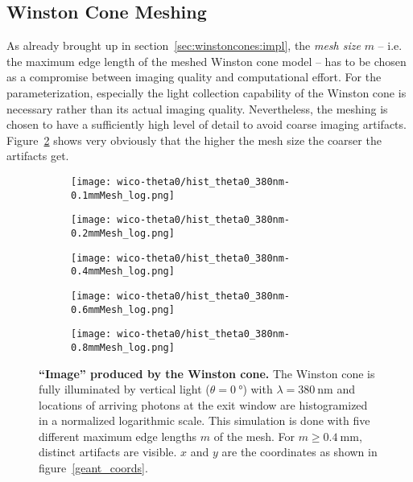 \subsection{Winston Cone Meshing}\label{sec:wico_meshing}

As already brought up in section~\ref{sec:winstoncones:impl}, the \textit{mesh size} $m$ -- i.e. the maximum edge length of the meshed Winston cone model -- has to be chosen as a compromise between imaging quality and computational effort. For the \iceact parameterization, especially the light collection capability of the Winston cone is necessary rather than its actual imaging quality. Nevertheless, the meshing is chosen to have a sufficiently high level of detail to avoid coarse imaging artifacts. Figure~\ref{wico:theta0_image} shows very obviously that the higher the mesh size the coarser the artifacts get. 

\begin{figure}[H]
	\centering
	\begin{subfigure}[t]{0.495\textwidth}
		\texttt{[image: wico-theta0/hist\_theta0\_380nm-0.1mmMesh\_log.png]}
	\end{subfigure}
	\hfill
	\begin{subfigure}[t]{0.495\textwidth}
		\texttt{[image: wico-theta0/hist\_theta0\_380nm-0.2mmMesh\_log.png]}
	\end{subfigure}
	\vfill
	\begin{subfigure}[t]{0.495\textwidth}
		\texttt{[image: wico-theta0/hist\_theta0\_380nm-0.4mmMesh\_log.png]}
		\label{wico:theta0_image:m04}
	\end{subfigure}
	\hfill
	\begin{subfigure}[t]{0.495\textwidth}
		\texttt{[image: wico-theta0/hist\_theta0\_380nm-0.6mmMesh\_log.png]}
	\end{subfigure}
	\hfill
	\begin{subfigure}[t]{0.495\textwidth}
		\texttt{[image: wico-theta0/hist\_theta0\_380nm-0.8mmMesh\_log.png]}
	\end{subfigure}
	\hfill
	\begin{minipage}[t]{0.495\textwidth}
		\vspace{-190pt}
		\caption[\enquote{Image} produced by the \iceact Winston cone]{\textbf{\enquote{Image} produced by the \iceact Winston cone.} The Winston cone is fully illuminated by vertical light ($\theta=\SI{0}{\degree}$) with $\lambda=\SI{380}{\nano\meter}$ and locations of arriving photons at the exit window are histogramized in a normalized logarithmic scale. This simulation is done with five different maximum edge lengths $m$ of the mesh. For $m\geq\SI{0.4}{\milli\meter}$, distinct artifacts are visible. $x$ and $y$ are the \geant coordinates as shown in figure~\ref{geant_coords}.}
		\label{wico:theta0_image}
	\end{minipage}
\end{figure}

